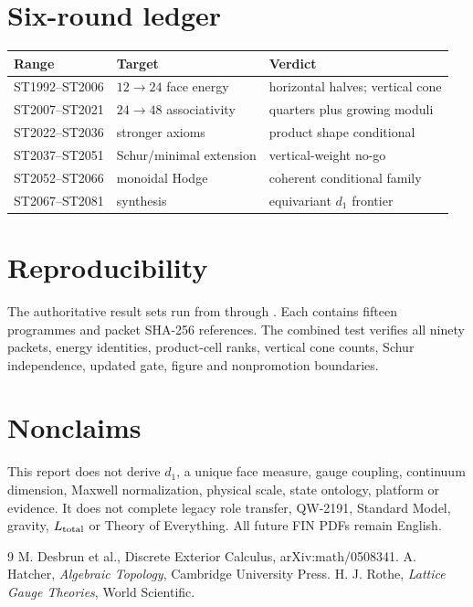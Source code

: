 \documentclass[11pt,a4paper]{article}
\begin{document}
\section{Six-round ledger}
\begin{longtable}{@{}p{}p{}p{}@{}}
\toprule
Range & Target & Verdict \\
\midrule\endhead
ST1992--ST2006 & $12\to24$ face energy & horizontal halves; vertical cone \\
ST2007--ST2021 & $24\to48$ associativity & quarters plus growing moduli \\
ST2022--ST2036 & stronger axioms & product shape conditional \\
ST2037--ST2051 & Schur/minimal extension & vertical-weight no-go \\
ST2052--ST2066 & monoidal Hodge & coherent conditional family \\
ST2067--ST2081 & synthesis & equivariant $d_1$ frontier \\
\bottomrule
\end{longtable}

\section{Reproducibility}
The authoritative result sets run from
 through
.  Each contains fifteen programmes and
packet SHA-256 references.  The combined test
 verifies all ninety packets, energy identities,
product-cell ranks, vertical cone counts, Schur independence, updated gate,
figure and nonpromotion boundaries.

\section{Nonclaims}
This report does not derive $d_1$, a unique face measure, gauge coupling,
continuum dimension, Maxwell normalization, physical scale, state ontology,
platform or evidence.  It does not complete legacy role transfer, QW-2191,
Standard Model, gravity, $L_{\rm total}$ or Theory of Everything.  All future
FIN PDFs remain English.

\begin{thebibliography}{9}
 M. Desbrun et al., Discrete Exterior Calculus, arXiv:math/0508341.
 A. Hatcher, \emph{Algebraic Topology}, Cambridge University Press.
 H. J. Rothe, \emph{Lattice Gauge Theories}, World Scientific.
\end{thebibliography}
\end{document}

